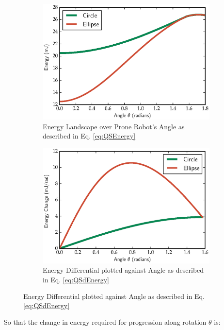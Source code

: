 \documentclass[letterpaper]{report}
\begin{document}
\begin{figure}[ht]
  \centering
  \begin{subfigure}[t]{0.45\textwidth}
    \centering
    \includegraphics[width=1.0\textwidth]{EnergyLandscape.eps}
    \caption{\label{fig:QSEnergy}Energy Landscape over Prone Robot's Angle as described in Eq. \ref{eq:QSEnergy}}
  \end{subfigure}
  \hfill
  \begin{subfigure}[t]{0.45\textwidth}
    \centering
    \includegraphics[width=1.0\textwidth]{dEnergyLandscape.eps}
    \caption{\label{fig:QSdEnergy}Energy Differential plotted against Angle as described in Eq. \ref{eq:QSdEnergy}}
  \end{subfigure}
\end{figure}

So that the change in energy required for progression along rotation $\theta$ is:
\end{document}
